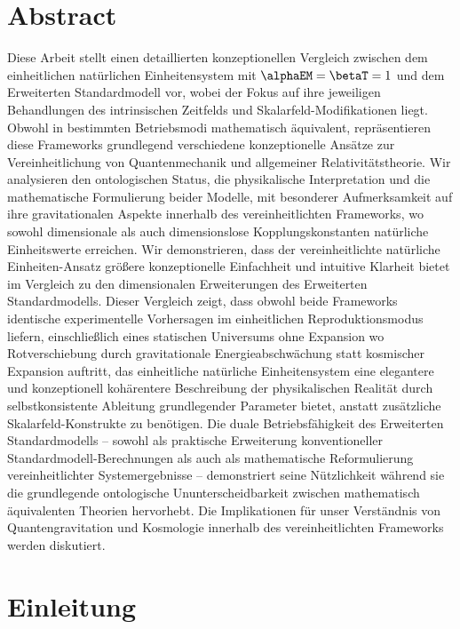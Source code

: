 \section*{Abstract}
		Diese Arbeit stellt einen detaillierten konzeptionellen Vergleich zwischen dem einheitlichen natürlichen Einheitensystem mit $\alphaEM = \betaT = 1$ und dem Erweiterten Standardmodell vor, wobei der Fokus auf ihre jeweiligen Behandlungen des intrinsischen Zeitfelds und Skalarfeld-Modifikationen liegt. Obwohl in bestimmten Betriebsmodi mathematisch äquivalent, repräsentieren diese Frameworks grundlegend verschiedene konzeptionelle Ansätze zur Vereinheitlichung von Quantenmechanik und allgemeiner Relativitätstheorie. Wir analysieren den ontologischen Status, die physikalische Interpretation und die mathematische Formulierung beider Modelle, mit besonderer Aufmerksamkeit auf ihre gravitationalen Aspekte innerhalb des vereinheitlichten Frameworks, wo sowohl dimensionale als auch dimensionslose Kopplungskonstanten natürliche Einheitswerte erreichen. Wir demonstrieren, dass der vereinheitlichte natürliche Einheiten-Ansatz größere konzeptionelle Einfachheit und intuitive Klarheit bietet im Vergleich zu den dimensionalen Erweiterungen des Erweiterten Standardmodells. Dieser Vergleich zeigt, dass obwohl beide Frameworks identische experimentelle Vorhersagen im einheitlichen Reproduktionsmodus liefern, einschließlich eines statischen Universums ohne Expansion wo Rotverschiebung durch gravitationale Energieabschwächung statt kosmischer Expansion auftritt, das einheitliche natürliche Einheitensystem eine elegantere und konzeptionell kohärentere Beschreibung der physikalischen Realität durch selbstkonsistente Ableitung grundlegender Parameter bietet, anstatt zusätzliche Skalarfeld-Konstrukte zu benötigen. Die duale Betriebsfähigkeit des Erweiterten Standardmodells – sowohl als praktische Erweiterung konventioneller Standardmodell-Berechnungen als auch als mathematische Reformulierung vereinheitlichter Systemergebnisse – demonstriert seine Nützlichkeit während sie die grundlegende ontologische Ununterscheidbarkeit zwischen mathematisch äquivalenten Theorien hervorhebt. Die Implikationen für unser Verständnis von Quantengravitation und Kosmologie innerhalb des vereinheitlichten Frameworks werden diskutiert.

	
	\section{Einleitung}
	\label{sec:introduction}
	
